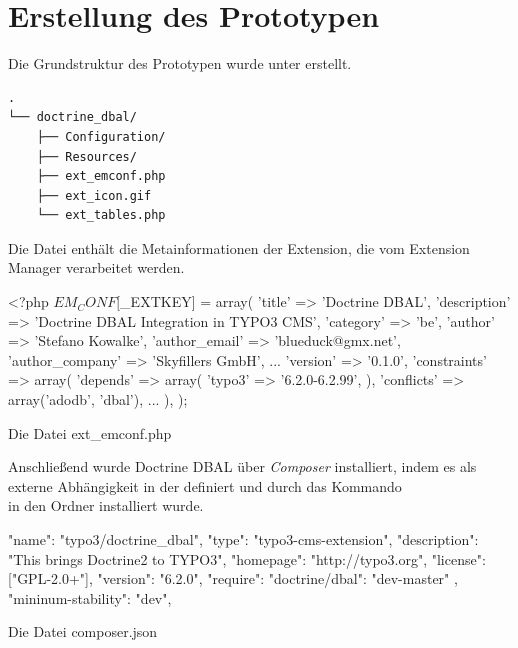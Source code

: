 \section{Erstellung des Prototypen}
\label{prototype:sec:createPrototype}
Die Grundstruktur des Prototypen wurde unter  erstellt.

\begin{Verbatim}[samepage=true]
.
└── doctrine_dbal/
    ├── Configuration/
    ├── Resources/
    ├── ext_emconf.php
    ├── ext_icon.gif
    └── ext_tables.php
\end{Verbatim}

Die Datei  enthält die Metainformationen der Extension, die vom Extension Manager verarbeitet werden.

\begin{listing}
\begin{phpcode}
<?php
$EM_CONF[$_EXTKEY] = array(
	'title' => 'Doctrine DBAL',
	'description' => 'Doctrine DBAL Integration in TYPO3 CMS',
	'category' => 'be',
	'author' => 'Stefano Kowalke',
	'author_email' => 'blueduck@gmx.net',
	'author_company' => 'Skyfillers GmbH',
	...
	'version' => '0.1.0',
	'constraints' => array(
		'depends' => array(
			'typo3' => '6.2.0-6.2.99',
		),
		'conflicts' => array('adodb', 'dbal'),
	...
	),
);
\end{phpcode}
\caption{Die Datei ext\_emconf.php}
\label{lst:extEmconf}
\end{listing}

Anschließend wurde Doctrine DBAL über \textit{Composer} installiert, indem es als externe Abhängigkeit in der  definiert und durch das Kommando\\  in den Ordner  installiert wurde.

\begin{listing}[H]
\begin{jsoncode}
{
	"name": "typo3/doctrine_dbal",
	"type": "typo3-cms-extension",
	"description": "This brings Doctrine2 to TYPO3",
	"homepage": "http://typo3.org",
	"license": ["GPL-2.0+"],
	"version": "6.2.0",
	"require": {
		"doctrine/dbal": "dev-master"
	},
	"mininum-stability": "dev",
}
\end{jsoncode}
\caption{Die Datei composer.json}
\label{lst:composer}
\end{listing}


